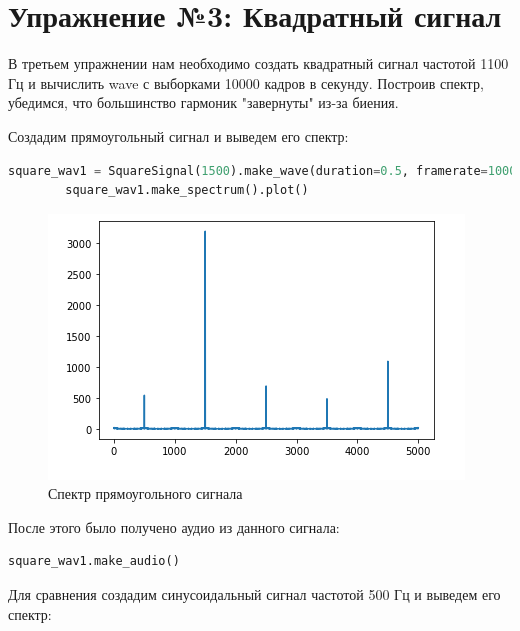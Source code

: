 \documentclass[a4paper, 14pt]{extarticle}
\begin{document}
    \newpage


    \section{Упражнение №3: Квадратный сигнал}
    \label{sec:3_square_signal}

    В третьем упражнении нам необходимо создать квадратный сигнал частотой 1100 Гц и вычислить wave с выборками 10000 кадров в секунду.
    Построив спектр, убедимся, что большинство гармоник "завернуты" из-за биения.

    Создадим прямоугольный сигнал и выведем его спектр:

    \begin{lstlisting}[language=Python, caption= Создание сигнала и вывод его спектра, label={lst:gen_signal_plot}]
        square_wav1 = SquareSignal(1500).make_wave(duration=0.5, framerate=10000)
        square_wav1.make_spectrum().plot()
    \end{lstlisting}

    \begin{figure}[H]
        \centering
        \includegraphics[width=\textwidth]{square_signal_spectr}
        \caption{Спектр прямоугольного сигнала}
        \label{fig:square_signal_spectr}
    \end{figure}

    После этого было получено аудио из данного сигнала:

    \begin{lstlisting}[language=Python, caption= Получение аудио, label={lst:make_audio_from_signal}]
        square_wav1.make_audio()
    \end{lstlisting}

    Для сравнения создадим синусоидальный сигнал частотой 500 Гц и выведем его спектр:
\end{document}
